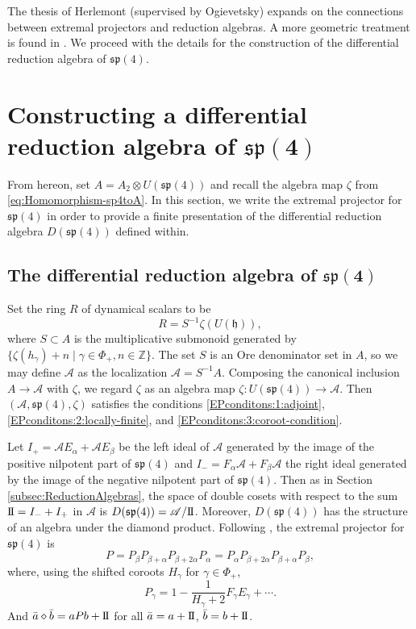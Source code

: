 \documentclass[pdftex]{sigma}
\numberwithin{equation}{section}
\newcommand{\II}{\mathrm{I\hspace{-.1em}I}}
\begin{document}
The thesis \cite{herlemontDifferentialCalculusMathbf2017} of Herlemont (supervised by Ogievetsky) expands on the connections between extremal projectors and reduction algebras. A more geometric treatment is found in \cite{sevostyanovGeometricMeaningZhelobenko2013}. We proceed with the details for the construction of the differential reduction algebra of $\mathfrak{sp}(4)$.


\section[Constructing a differential reduction algebra of sp(4)]{Constructing a differential reduction algebra of $\boldsymbol{\mathfrak{sp}(4)}$}\label{sec:sp4reduction}
From hereon, set $A = A_{2} \otimes U(\mathfrak{sp}(4))$ and recall the algebra map $\zeta$ from \eqref{eq:Homomorphism-sp4toA}. In this section, we write the extremal projector for $\mathfrak{sp}(4)$ in order to provide a finite presentation of the differential reduction algebra $D(\mathfrak{sp}(4))$ defined within.

\subsection[The differential reduction algebra of sp(4)]{The differential reduction algebra of $\boldsymbol{\mathfrak{sp}(4)}$}\label{subsec:DRAsp4}

Set the ring $R$ of dynamical scalars to be
\begin{equation}\label{eq:R-ring-of-dynamical-scalars}
	R=S^{-1}\zeta(U(\mathfrak{h})),
\end{equation}
where $S\subset A$ is the multiplicative submonoid generated by
$\{\zeta(h_\gamma)+n\mid \gamma\in\Phi_+, n \in \mathbb{Z}\}$. The set $S$ is an Ore denominator set in $A$, so we may define $\mathscr{A}$ as the localization
$\mathscr{A} = S^{-1}A$.
Composing the canonical inclusion $A\to\mathscr{A}$ with $\zeta$, we regard $\zeta$ as an algebra map $\zeta\colon U(\mathfrak{sp}(4))\to\mathscr{A}$.
Then~$(\mathscr{A},\mathfrak{sp}(4),\zeta)$ satisfies the conditions \ref{EPconditons:1:adjoint}, \ref{EPconditons:2:locally-finite}, and \ref{EPconditons:3:coroot-condition}.

Let
$I_+ = \mathscr{A}E_\alpha+\mathscr{A}E_\beta$
be the left ideal of $\mathscr{A}$ generated by the image of the positive nilpotent part of $\mathfrak{sp}(4)$ and $I_-=F_\alpha\mathscr{A}+F_\beta\mathscr{A}$ the right ideal generated by the image of the negative nilpotent part of $\mathfrak{sp}(4)$. Then as in Section \ref{subsec:ReductionAlgebras}, the space of double cosets with respect to the sum $\II=I_-+I_+$ in $\mathscr{A}$ is
$D(\mathfrak{sp}(4))=\mathscr{A}/\II$.
Moreover, $D(\mathfrak{sp}(4))$ has the structure of an algebra under the diamond product. Following \cite[Theorem 2]{zhelobenkoExtremalProjectorsGeneralized1989}, the extremal projector for $\mathfrak{sp}(4)$ is
\[
	P=P_\beta P_{\beta+\alpha}P_{\beta+2\alpha}P_\alpha = P_\alpha P_{\beta+2\alpha}P_{\beta+\alpha}P_{\beta},
\]
where, using the shifted coroots $H_\gamma$ for $\gamma \in \Phi_{+}$,
\[
	P_\gamma = 1-\frac{1}{H_\gamma+2}F_\gamma E_\gamma + \cdots.
\]
And
$\bar a\diamond \bar b = aPb + \II$ for all $\bar a=a+\II$, $ \bar b=b+\II$.
\end{document}
